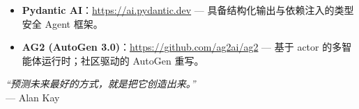 \begin{itemize}
  \item \textbf{Pydantic AI}：\href{https://ai.pydantic.dev}{https://ai.pydantic.dev} --- 具备结构化输出与依赖注入的类型安全 Agent 框架。
  \item \textbf{AG2 (AutoGen 3.0)}：\href{https://github.com/ag2ai/ag2}{https://github.com/ag2ai/ag2} --- 基于 actor 的多智能体运行时；社区驱动的 AutoGen 重写。
\end{itemize}

\emph{“预测未来最好的方式，就是把它创造出来。”}\\

--- Alan Kay
